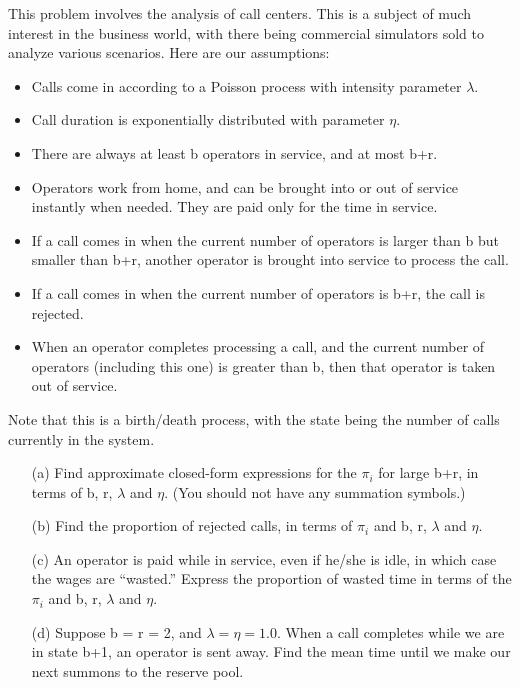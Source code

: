 \oneproblem
This problem involves the analysis of call centers. This is a subject  
of much interest in the business world, with there being commercial 
simulators sold to analyze various scenarios. Here are our assumptions:

\begin{itemize}

\item Calls come in according to a Poisson process with intensity
parameter $\lambda$.

\item Call duration is exponentially distributed with parameter $\eta$.

\item There are always at least b operators in service, and at most b+r.

\item Operators work from home, and can be brought into or out of
service instantly when needed.  They are paid only for the time in
service.

\item If a call comes in when the current number of operators is larger
than b but smaller than b+r, another operator is brought into
service to process the call.

\item If a call comes in when the current number of operators is b+r,
the call is rejected.

\item When an operator completes processing a call, and the current
number of operators (including this one) is greater than b, then that
operator is taken out of service.

\end{itemize}

Note that this is a birth/death process, with the state being the
number of calls currently in the system.

\begin{itemize}

\item [(a)] Find approximate closed-form expressions for the $\pi_i$ for
large b+r, in terms of b, r, $\lambda$ and $\eta$.  (You should not have
any summation symbols.)

\item [(b)] Find the proportion of rejected calls, in terms of $\pi_i$
and b, r, $\lambda$ and $\eta$.

\item [(c)] An operator is paid while in service, even if he/she is
idle, in which case the wages are ``wasted.'' Express the proportion of
wasted time in terms of the $\pi_i$ and b, r, $\lambda$ and $\eta$.       

\item [(d)] Suppose b = r = 2, and $\lambda = \eta = 1.0$. When a call
completes while we are in state b+1, an operator is sent away. Find the
mean time until we make our next summons to the reserve pool.            

\end{itemize}

